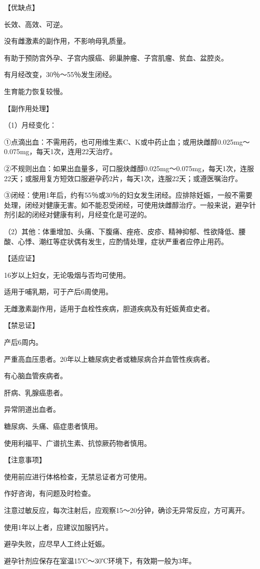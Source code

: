 \documentclass[12pt,UTF8]{ctexbook}
\begin{document}
【优缺点】

长效、高效、可逆。

没有雌激素的副作用，不影响母乳质量。

有助于预防宫外孕、子宫内膜癌、卵巢肿瘤、子宫肌瘤、贫血、盆腔炎。

有月经改变，30％～55％发生闭经。

生育能力恢复较慢。

【副作用处理】

（1）月经变化：

①点滴出血：不需用药，也可用维生素C、K或中药止血；或用炔雌醇0.025mg～0.075mg，每天1次，连用22天治疗。

②不规则出血：如果出血量多，可口服炔雌醇0.025mg～0.075mg，每天1次，连服22天；或服用复方短效口服避孕药2片，每天1次，连服22天；或遵医嘱治疗。

③闭经：使用1年后，约有55％或30％的妇女发生闭经。应排除妊娠，一般不需要处理，闭经对健康无害。如不能忍受闭经，可使用炔雌醇治疗。一般来说，避孕针剂引起的闭经对健康有利，月经变化是可逆的。

（2）其他：体重增加、头痛、下腹痛、痤疮、皮疹、精神抑郁、性欲降低、腰酸、心悸、潮红等症状偶有发生，应酌情处理，症状严重者应停止用药。

【适应证】

16岁以上妇女，无论吸烟与否均可使用。

适用于哺乳期，可于产后6周使用。

无雌激素副作用，适用于血栓性疾病，胆道疾病及有妊娠黄疸史者。

【禁忌证】

产后6周内。

严重高血压患者。20年以上糖尿病史者或糖尿病合并血管性疾病者。

有心脑血管疾病者。

肝病、乳腺癌患者。

异常阴道出血者。

糖尿病、头痛、癌症患者慎用。

使用利福平、广谱抗生素、抗惊厥药物者慎用。

【注意事项】

使用前应进行体格检查，无禁忌证者方可使用。

作好咨询，有问题及时检查。

注意过敏反应，每次注射后，应观察15～20分钟，确诊无异常反应，方可离开。

使用1年以上者，应建议加服钙片。

避孕失败，应尽早人工终止妊娠。

避孕针剂应保存在室温15℃～30℃环境下，有效期一般为3年。
\end{document}
